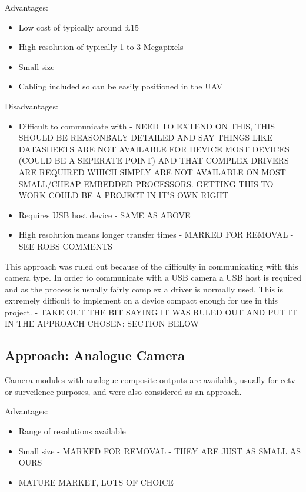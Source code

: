 Advantages:
      \begin{itemize}
         \item Low cost of typically around \pounds 15
         \item High resolution of typically 1 to 3 Megapixels
		 \item Small size
		 \item Cabling included so can be easily positioned in the UAV
     \end{itemize}

Disadvantages:
     \begin{itemize}
        \item Difficult to communicate with - NEED TO EXTEND ON THIS, THIS SHOULD BE REASONBALY DETAILED AND SAY THINGS LIKE DATASHEETS ARE NOT AVAILABLE FOR DEVICE MOST DEVICES (COULD BE A SEPERATE POINT) AND THAT COMPLEX DRIVERS ARE REQUIRED WHICH SIMPLY ARE NOT AVAILABLE ON MOST SMALL/CHEAP EMBEDDED PROCESSORS. GETTING THIS TO WORK COULD BE A PROJECT IN IT'S OWN RIGHT
        \item Requires USB host device - SAME AS ABOVE
	\item High resolution means longer transfer times - MARKED FOR REMOVAL - SEE ROBS COMMENTS
     \end{itemize}

This approach was ruled out because of the difficulty in communicating with this camera type. In order to communicate with a USB camera a USB host is required and as the process is usually fairly complex a driver is normally used. This is extremely difficult to implement on a device compact enough for use in this project. - TAKE OUT THE BIT SAYING IT WAS RULED OUT AND PUT IT IN THE APPROACH CHOSEN: SECTION BELOW

\subsection{Approach: Analogue Camera}
\label{sec:Analog_option}
Camera modules with analogue composite outputs are available, usually for cctv or surveilence purposes, and were also considered as an approach.

Advantages:
      \begin{itemize}
         \item Range of resolutions available
	\item Small size - MARKED FOR REMOVAL - THEY ARE JUST AS SMALL AS OURS
	\item MATURE MARKET, LOTS OF CHOICE
	
     \end{itemize}

